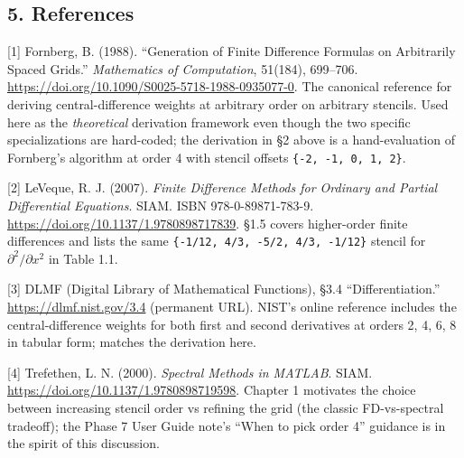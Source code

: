 \subsection{5. References}\label{references}

{[}1{]} Fornberg, B. (1988). ``Generation of Finite Difference Formulas
on Arbitrarily Spaced Grids.'' \emph{Mathematics of Computation},
51(184), 699--706.
\url{https://doi.org/10.1090/S0025-5718-1988-0935077-0}. The canonical
reference for deriving central-difference weights at arbitrary order on
arbitrary stencils. Used here as the \emph{theoretical} derivation
framework even though the two specific specializations are hard-coded;
the derivation in §2 above is a hand-evaluation of Fornberg's algorithm
at order 4 with stencil offsets
\passthrough{\lstinline!\{-2, -1, 0, 1, 2\}!}.

{[}2{]} LeVeque, R. J. (2007). \emph{Finite Difference Methods for
Ordinary and Partial Differential Equations}. SIAM. ISBN
978-0-89871-783-9. \url{https://doi.org/10.1137/1.9780898717839}. §1.5
covers higher-order finite differences and lists the same
\passthrough{\lstinline!\{-1/12, 4/3, -5/2, 4/3, -1/12\}!} stencil for
\(\partial^2/\partial x^2\) in Table 1.1.

{[}3{]} DLMF (Digital Library of Mathematical Functions), §3.4
``Differentiation.'' \url{https://dlmf.nist.gov/3.4} (permanent URL).
NIST's online reference includes the central-difference weights for both
first and second derivatives at orders 2, 4, 6, 8 in tabular form;
matches the derivation here.

{[}4{]} Trefethen, L. N. (2000). \emph{Spectral Methods in MATLAB}.
SIAM. \url{https://doi.org/10.1137/1.9780898719598}. Chapter 1 motivates
the choice between increasing stencil order vs refining the grid (the
classic FD-vs-spectral tradeoff); the Phase 7 User Guide note's ``When
to pick order 4'' guidance is in the spirit of this discussion.
